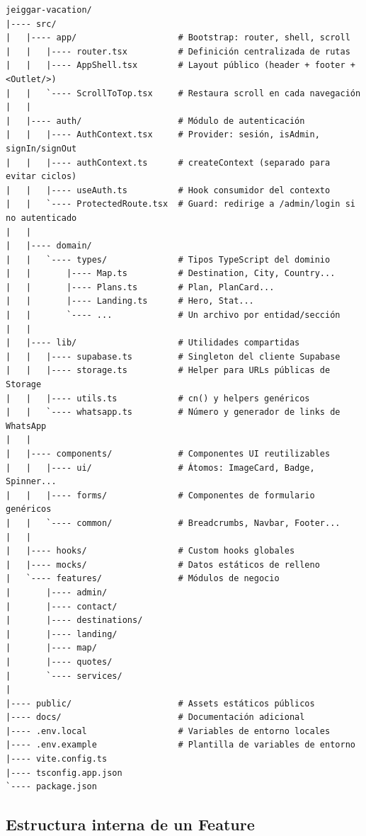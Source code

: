 \documentclass[12pt,letterpaper]{article}
\begin{document}
\begin{lstlisting}[language={}]
jeiggar-vacation/
|---- src/
|   |---- app/                    # Bootstrap: router, shell, scroll
|   |   |---- router.tsx          # Definición centralizada de rutas
|   |   |---- AppShell.tsx        # Layout público (header + footer + <Outlet/>)
|   |   `---- ScrollToTop.tsx     # Restaura scroll en cada navegación
|   |
|   |---- auth/                   # Módulo de autenticación
|   |   |---- AuthContext.tsx     # Provider: sesión, isAdmin, signIn/signOut
|   |   |---- authContext.ts      # createContext (separado para evitar ciclos)
|   |   |---- useAuth.ts          # Hook consumidor del contexto
|   |   `---- ProtectedRoute.tsx  # Guard: redirige a /admin/login si no autenticado
|   |
|   |---- domain/
|   |   `---- types/              # Tipos TypeScript del dominio
|   |       |---- Map.ts          # Destination, City, Country...
|   |       |---- Plans.ts        # Plan, PlanCard...
|   |       |---- Landing.ts      # Hero, Stat...
|   |       `---- ...             # Un archivo por entidad/sección
|   |
|   |---- lib/                    # Utilidades compartidas
|   |   |---- supabase.ts         # Singleton del cliente Supabase
|   |   |---- storage.ts          # Helper para URLs públicas de Storage
|   |   |---- utils.ts            # cn() y helpers genéricos
|   |   `---- whatsapp.ts         # Número y generador de links de WhatsApp
|   |
|   |---- components/             # Componentes UI reutilizables
|   |   |---- ui/                 # Átomos: ImageCard, Badge, Spinner...
|   |   |---- forms/              # Componentes de formulario genéricos
|   |   `---- common/             # Breadcrumbs, Navbar, Footer...
|   |
|   |---- hooks/                  # Custom hooks globales
|   |---- mocks/                  # Datos estáticos de relleno
|   `---- features/               # Módulos de negocio
|       |---- admin/
|       |---- contact/
|       |---- destinations/
|       |---- landing/
|       |---- map/
|       |---- quotes/
|       `---- services/
|
|---- public/                     # Assets estáticos públicos
|---- docs/                       # Documentación adicional
|---- .env.local                  # Variables de entorno locales
|---- .env.example                # Plantilla de variables de entorno
|---- vite.config.ts
|---- tsconfig.app.json
`---- package.json
\end{lstlisting}

\subsection{Estructura interna de un Feature}
\end{document}

